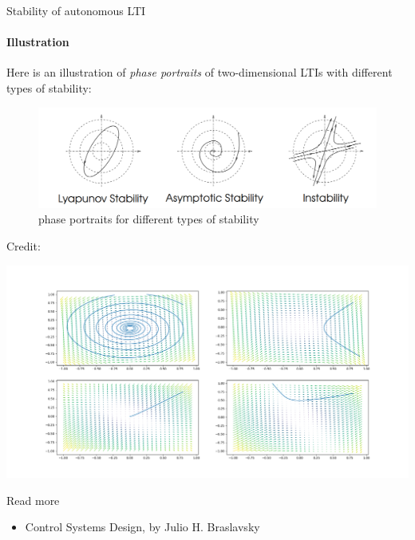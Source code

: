 \documentclass{beamer}
\begin{document}
\begin{frame}{Stability of autonomous LTI}
\framesubtitle{Illustration}
\begin{flushleft}

Here is an illustration of \emph{phase portraits} of two-dimensional LTIs with different types of stability:

\begin{figure}
    \centering
    \includegraphics[width=1.0\linewidth]{Stability.PNG}
    \caption{phase portraits for different types of stability}
    \label{fig:Stability}
\end{figure}

\bigskip

\scriptsize{Credit: }

\end{flushleft}
\end{frame}


\begin{frame}
\hspace*{-2.5cm}
\includegraphics[height=\textheight,width=1.4\textwidth,keepaspectratio]{Figure_2.png}
\end{frame}



\begin{frame}{Read more}

\begin{itemize}
\item Control Systems Design, by Julio H. Braslavsky 


\end{itemize}

\end{frame}
\end{document}
